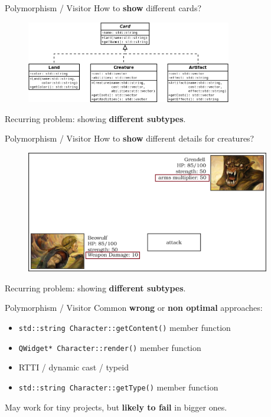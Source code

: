 \documentclass[11pt]{beamer}
\renewcommand{\emph}[1]{\textbf{#1}}
\begin{document}
\begin{frame}{Polymorphism / Visitor}
 How to \emph{show} different cards?
 \begin{figure}
  \includegraphics[width=0.80\textwidth]{assets/diagram-cards}
 \end{figure}
 Recurring problem: showing \emph{different subtypes}.
\end{frame}

\begin{frame}{Polymorphism / Visitor}
 How to \emph{show} different details for creatures?
 \begin{figure}
  \includegraphics[width=0.95\textwidth]{assets/figure-battle-scene-5}
 \end{figure}
 Recurring problem: showing \emph{different subtypes}.
\end{frame}

\begin{frame}{Polymorphism / Visitor}
 Common \emph{wrong} or \emph{non optimal} approaches:
 \begin{itemize}
  \item \texttt{std::string Character::getContent()} member function
  \item \texttt{QWidget* Character::render()} member function
  \item RTTI / dynamic cast / typeid
  \item \texttt{std::string Character::getType()} member function
 \end{itemize}
 May work for tiny projects, but \emph{likely to fail} in bigger ones.
\end{frame}
\end{document}
